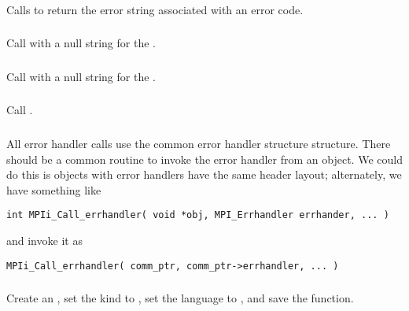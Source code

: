\documentclass{article}
\begin{document}
\subsubsection{}
Calls  to return the error string
associated with an error code. 

\subsubsection{}
Call  with a null string for the
. 

\subsubsection{}
Call  with a null string for the
. 

\subsubsection{}
Call .

\subsubsection{}
All error handler calls use the common error handler structure
 structure.  There should be a common
routine to invoke the error handler from an object.  We could do this
is objects with error handlers have the same header layout;
alternately, we have something like
\begin{verbatim}
int MPIi_Call_errhandler( void *obj, MPI_Errhandler errhander, ... )
\end{verbatim}
and invoke it as
\begin{verbatim}
MPIi_Call_errhandler( comm_ptr, comm_ptr->errhandler, ... )
\end{verbatim}

\subsubsection{}
Create an , set the kind to
, set the language to , and
save the function.  
\end{document}

